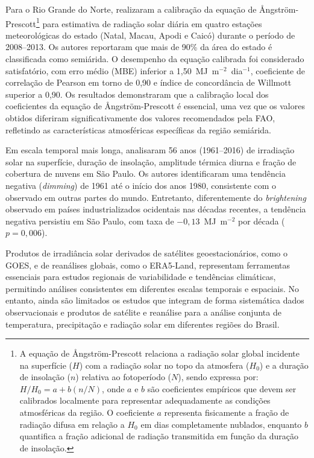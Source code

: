 Para o Rio Grande do Norte, \citet{medeiros2017} realizaram a calibração da equação de Ångström-Prescott\footnote{A equação de Ångström-Prescott relaciona a radiação solar global incidente na superfície ($H$) com a radiação solar no topo da atmosfera ($H_0$) e a duração de insolação ($n$) relativa ao fotoperíodo ($N$), sendo expressa por: $H/H_0 = a + b(n/N)$, onde $a$ e $b$ são coeficientes empíricos que devem ser calibrados localmente para representar adequadamente as condições atmosféricas da região. O coeficiente 
$a$ representa fisicamente a fração de radiação difusa em relação a $H_0$ em dias completamente 
nublados, enquanto $b$ quantifica a fração adicional de radiação transmitida em função da duração de insolação.} para estimativa de radiação solar diária em quatro estações meteorológicas do estado (Natal, Macau, Apodi e Caicó) durante o período de 2008--2013. Os autores reportaram que mais de 90\% da área do estado é classificada como semiárida. O desempenho da equação calibrada foi considerado satisfatório, com erro médio (MBE) inferior a 1,50~MJ~m$^{-2}$~dia$^{-1}$, coeficiente de correlação de Pearson em torno de 0,90 e índice de concordância de Willmott superior a 0,90. Os resultados demonstraram que a calibração local dos coeficientes da equação de Ångström-Prescott é essencial, uma vez que os valores obtidos diferiram significativamente dos valores recomendados pela FAO, refletindo as características atmosféricas específicas da região semiárida.

Em escala temporal mais longa, \citet{yamasoe2021} analisaram 56 anos (1961--2016) de irradiação solar na superfície, duração de insolação, amplitude térmica diurna e fração de cobertura de nuvens em São Paulo. Os autores identificaram uma tendência negativa (\textit{dimming}) de 1961 até o início dos anos 1980, consistente com o observado em outras partes do mundo. Entretanto, diferentemente do \textit{brightening} observado em países industrializados ocidentais nas décadas recentes, a tendência negativa persistiu em São Paulo, com taxa de $-0,13$~MJ~m$^{-2}$ por década ($p = 0,006$).

Produtos de irradiância solar derivados de satélites geoestacionários, como o GOES, e de reanálises globais, como o ERA5-Land, representam ferramentas essenciais para estudos regionais de variabilidade e tendências climáticas, permitindo análises consistentes em diferentes escalas temporais e espaciais. No entanto, ainda são limitados os estudos que integram de forma sistemática dados observacionais e produtos de satélite e reanálise para a análise conjunta de temperatura, precipitação e radiação solar em diferentes regiões do 
Brasil.


